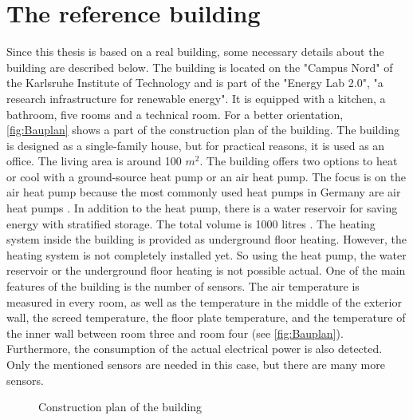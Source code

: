 \section{The reference building}
\label{section:building}
    Since this thesis is based on a real building, some necessary details about the building are described below.
    \newline
    The building is located on the "Campus Nord" of the Karlsruhe Institute of Technology and is part of the "Energy Lab 2.0", "a research infrastructure for renewable energy"\cite{KIT.2021}. It is equipped with a kitchen, a bathroom, five rooms and a technical room. For a better orientation, \autoref{fig:Bauplan} shows a part of the construction plan of the building. The building is designed as a single-family house, but for practical reasons, it is used as an office. The living area is around 100 $m^2$. The building offers two options to heat or cool with a ground-source heat pump or an air heat pump. The focus is on the air heat pump because the most commonly used heat pumps in Germany are air heat pumps \cite{bwp.2021}. In addition to the heat pump, there is a water reservoir for saving energy with stratified storage. The total volume is 1000 litres \cite{Oskar}. The heating system inside the building is provided as underground floor heating. However, the heating system is not completely installed yet. So using the heat pump, the water reservoir or the underground floor heating is not possible actual.
    \newline
    One of the main features of the building is the number of sensors. The air temperature is measured in every room, as well as the temperature in the middle of the exterior wall, the screed temperature, the floor plate temperature, and the temperature of the inner wall between room three and room four (see \autoref{fig:Bauplan}). Furthermore, the consumption of the actual electrical power is also detected. Only the mentioned sensors are needed in this case, but there are many more sensors.
    \begin{figure}
        \centering
        \def\svgwidth{360pt}
        
        \caption{Construction plan of the building \cite{Bauplan}}
        \label{fig:Bauplan}
    \end{figure}